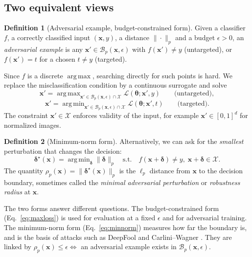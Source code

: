 \documentclass[10pt,a4paper]{extarticle}
\theoremstyle{definition}
\newtheorem{definition}{Definition}[section]
\newcommand{\X}{\mathcal{X}}
\newcommand{\Loss}{\mathcal{L}}
\newcommand{\x}{\mathbf{x}}
\newcommand{\xadv}{\mathbf{x}'}
\newcommand{\bdelta}{\boldsymbol{\delta}}
\newcommand{\btheta}{\boldsymbol{\theta}}
\newcommand{\B}{\mathcal{B}}
\DeclareMathOperator*{\argmax}{arg\,max}
\DeclareMathOperator*{\argmin}{arg\,min}
\begin{document}
\subsection{Two equivalent views}

\begin{definition}[Adversarial example, budget-constrained form]
Given a classifier \(f\), a correctly classified input \((\x, y)\), a distance \(\|\cdot\|_p\) and a budget \(\epsilon > 0\), an \emph{adversarial example} is any \(\xadv \in \B_p(\x, \epsilon)\) with \(f(\xadv) \neq y\) (untargeted), or \(f(\xadv) = t\) for a chosen \(t \neq y\) (targeted).
\end{definition}

Since \(f\) is a discrete \(\argmax\), searching directly for such points is hard. We replace the misclassification condition by a continuous surrogate and solve
\begin{equation}\label{eq:maxloss}
\xadv = \argmax_{\xadv \in \B_p(\x,\epsilon) \cap \X} \Loss(\btheta; \xadv, y)
\qquad \text{(untargeted)},
\end{equation}
\begin{equation}\label{eq:maxloss-t}
\xadv = \argmin_{\xadv \in \B_p(\x,\epsilon) \cap \X} \Loss(\btheta; \xadv, t)
\qquad \text{(targeted)}.
\end{equation}
The constraint \(\xadv \in \X\) enforces validity of the input, for example \(\xadv \in [0,1]^d\) for normalized images.

\begin{definition}[Minimum-norm form]
Alternatively, we can ask for the \emph{smallest} perturbation that changes the decision:
\begin{equation}\label{eq:minnorm}
\bdelta^\star(\x) = \argmin_{\bdelta} \|\bdelta\|_p \quad \text{s.t.} \quad f(\x + \bdelta) \neq y,\; \x + \bdelta \in \X.
\end{equation}
The quantity \(\rho_p(\x) = \|\bdelta^\star(\x)\|_p\) is the \(\ell_p\) distance from \(\x\) to the decision boundary, sometimes called the \emph{minimal adversarial perturbation} or \emph{robustness radius} at \(\x\).
\end{definition}

The two forms answer different questions. The budget-constrained form (Eq.~\ref{eq:maxloss}) is used for evaluation at a fixed \(\epsilon\) and for adversarial training. The minimum-norm form (Eq.~\ref{eq:minnorm}) measures how far the boundary is, and is the basis of attacks such as DeepFool \citep{moosavi2016deepfool} and Carlini--Wagner \citep{carlini2017towards}. They are linked by \(\rho_p(\x) \le \epsilon \iff\) an adversarial example exists in \(\B_p(\x,\epsilon)\).
\end{document}
